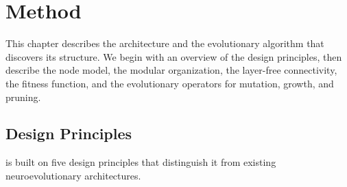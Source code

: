 
\chapter{Method}
\label{ch:method}

This chapter describes the \modnet{} architecture and the evolutionary
algorithm that discovers its structure. We begin with an overview of
the design principles, then describe the node model, the modular
organization, the layer-free connectivity, the fitness function, and
the evolutionary operators for mutation, growth, and pruning.

\section{Design Principles}
\label{sec:design-principles}

\modnet{} is built on five design principles that distinguish it from
existing neuroevolutionary architectures.

